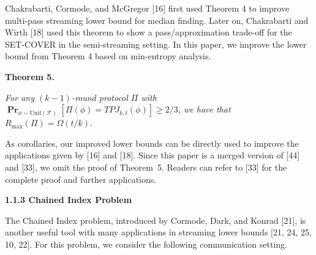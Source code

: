 Chakrabarti, Cormode, and McGregor [16] first used Theorem 4 to improve multi-pass streaming lower bound for median finding.
Later on, Chakrabarti and Wirth [18] used this theorem to show a pass/approximation trade-off for the SET-COVER in the semi-streaming setting. In this paper, we improve the lower bound from Theorem 4 based on min-entropy analysis.\par





\par\medskip\noindent\textbf{
\textbf{Theorem 5}\textbf{.}
}\par



\emph{For any $(k-1)$-round protocol $\Pi$ with $\operatorname*{\mathbf{Pr}}_{\phi\sim\mathrm{Unif}(\mathcal{F})}[\Pi(\phi)=TPJ_{k,t}(\phi)]\geq 2/3$,
we have that $R_{\max}(\Pi)=\Omega(t/k).$}\par






As corollaries, our improved lower bounds can be directly used to improve the applications given by [16] and [18]. Since this paper is a merged version of [44] and [33], we omit the proof of Theorem 5. Readers can refer to [33] for the complete proof and further applications.\par





\par\medskip\noindent\textbf{
1.1.3 Chained Index Problem}\par




The Chained Index problem, introduced by Cormode, Dark, and Konrad [21], is another useful tool with many applications in streaming lower bounds [21, 24, 25, 10, 22]. For this problem, we consider the following communication setting.\par


